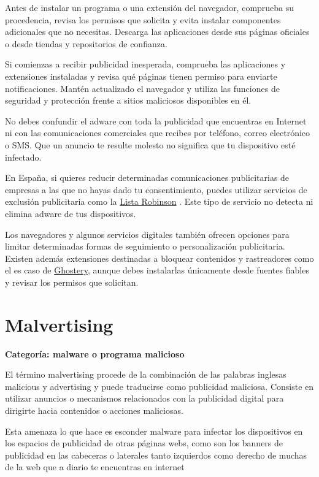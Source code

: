 \documentclass[
  spanish,
  a4paper,
  openany]{book}
\begin{document}
Antes de instalar un programa o una extensión del navegador, comprueba su procedencia, revisa los permisos que solicita y evita instalar componentes adicionales que no necesitas. Descarga las aplicaciones desde sus páginas oficiales o desde tiendas y repositorios de confianza.

Si comienzas a recibir publicidad inesperada, comprueba las aplicaciones y extensiones instaladas y revisa qué páginas tienen permiso para enviarte notificaciones. Mantén actualizado el navegador y utiliza las funciones de seguridad y protección frente a sitios maliciosos disponibles en él.

No debes confundir el adware con toda la publicidad que encuentras en Internet ni con las comunicaciones comerciales que recibes por teléfono, correo electrónico o SMS. Que un anuncio te resulte molesto no significa que tu dispositivo esté infectado.

En España, si quieres reducir determinadas comunicaciones publicitarias de empresas a las que no hayas dado tu consentimiento, puedes utilizar servicios de exclusión publicitaria como la \href{https://www.listarobinson.es/}{Lista Robinson} . Este tipo de servicio no detecta ni elimina adware de tus dispositivos.

Los navegadores y algunos servicios digitales también ofrecen opciones para limitar determinadas formas de seguimiento o personalización publicitaria. Existen además extensiones destinadas a bloquear contenidos y rastreadores como el es caso de \href{https://www.ghostery.com/}{Ghostery}, aunque debes instalarlas únicamente desde fuentes fiables y revisar los permisos que solicitan.

\section{Malvertising}\label{malvertising}

\textbf{Categoría: malware o programa malicioso}

El término malvertising procede de la combinación de las palabras inglesas malicious y advertising y puede traducirse como publicidad maliciosa. Consiste en utilizar anuncios o mecanismos relacionados con la publicidad digital para dirigirte hacia contenidos o acciones maliciosas.

Esta amenaza lo que hace es esconder malware para infectar los dispositivos en los espacios de publicidad de otras páginas webs, como son los banners de publicidad en las cabeceras o laterales tanto izquierdos como derecho de muchas de la web que a diario te encuentras en internet
\end{document}
